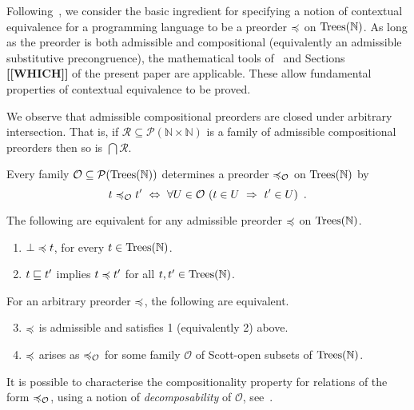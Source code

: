 \todo[inline]{[[MOTIVATE]]}
Following~\cite{gom}, we consider the basic ingredient for specifying  a notion of
contextual equivalence for a programming language to be a preorder $\preccurlyeq$ on $\textnormal{Trees}(\mathbb{N})$.
As long as the preorder is both admissible and compositional (equivalently an
admissible substitutive precongruence), the mathematical tools of~\cite{gom} and
Sections \textbf{[[WHICH]]} of the present paper are applicable. These allow fundamental properties of contextual equivalence to be proved.

We observe that admissible compositional preorders are closed under arbitrary intersection. That is, if
$\mathcal{R} \subseteq \mathcal{P}(\mathbb{N} \times \mathbb{N})$ is a family of admissible compositional preorders
then so is $\bigcap \mathcal{R}$.

Every family $\mathcal{O} \subseteq \mathcal{P}(\textnormal{Trees}(\mathbb{N}))$ determines a preorder $\preccurlyeq_\mathcal{O}$ on 
$\textnormal{Trees}(\mathbb{N})$ by
\begin{equation}
\label{equation:observational-preorder}
t \preccurlyeq_\mathcal{O} t' ~ \Leftrightarrow ~ \forall U \in \mathcal{O}~ (t \in U ~ \Rightarrow ~ t' \in U) \enspace .
\end{equation}

\begin{proposition} 
The following are equivalent for
any admissible  preorder  $\preccurlyeq$ on $\textnormal{Trees}(\mathbb{N})$.
\begin{enumerate} 
\item $\bot \preccurlyeq t$,  for every $t \in \textnormal{Trees}(\mathbb{N})$.
\item $t \sqsubseteq t'$ implies $t \preccurlyeq t'$ for all $t,t' \in \textnormal{Trees}(\mathbb{N})$.
\end{enumerate}
For an arbitrary preorder $\preccurlyeq$, the following are equivalent.
\begin{enumerate}
\setcounter{enumi}{2}
\item $\preccurlyeq$ is admissible and satisfies 1 (equivalently 2) above.
\item $\preccurlyeq$ arises as $\preccurlyeq_\mathcal{O}$ for some family $\mathcal{O}$ of Scott-open subsets
of $\textnormal{Trees}(\mathbb{N})$.
\end{enumerate}
\end{proposition}

It is possible to characterise the compositionality property for relations of the form $\preccurlyeq_\mathcal{O}$, using a notion of \emph{decomposability} of $\mathcal{O}$, see~\cite{gom}. 



